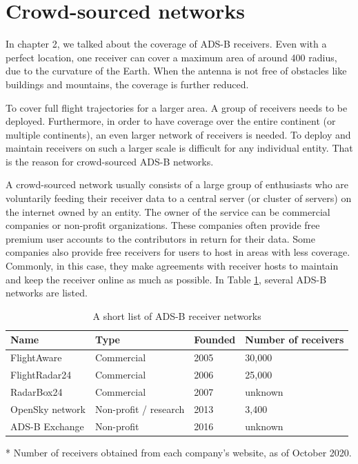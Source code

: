 \section{Crowd-sourced networks}

In chapter 2, we talked about the coverage of ADS-B receivers. Even with a perfect location, one receiver can cover a maximum area of around 400 radius, due to the curvature of the Earth. When the antenna is not free of obstacles like buildings and mountains, the coverage is further reduced. 

To cover full flight trajectories for a larger area. A group of receivers needs to be deployed. Furthermore, in order to have coverage over the entire continent (or multiple continents), an even larger network of receivers is needed. To deploy and maintain receivers on such a larger scale is difficult for any individual entity. That is the reason for crowd-sourced ADS-B networks. 

A crowd-sourced network usually consists of a large group of enthusiasts who are voluntarily feeding their receiver data to a central server (or cluster of servers) on the internet owned by an entity. The owner of the service can be commercial companies or non-profit organizations. These companies often provide free premium user accounts to the contributors in return for their data. Some companies also provide free receivers for users to host in areas with less coverage. Commonly, in this case, they make agreements with receiver hosts to maintain and keep the receiver online as much as possible. In Table \ref{tb:adsb_networks}, several ADS-B networks are listed.

\begin{table}[ht]
\caption{A short list of ADS-B receiver networks}
\label{tb:adsb_networks}
\begin{threeparttable}
\begin{tabular}{|l|l|l|l|}
\hline
\textbf{Name} & \textbf{Type} & \textbf{Founded} & \textbf{Number of receivers} \\ \hline
FlightAware & Commercial & 2005 & 30,000\tnote{*} \\ \hline
FlightRadar24 & Commercial & 2006 & 25,000\tnote{*} \\ \hline
RadarBox24 & Commercial & 2007 & unknown \\ \hline
OpenSky network & Non-profit / research & 2013 & 3,400\tnote{*} \\ \hline
ADS-B Exchange & Non-profit & 2016 & unknown \\ \hline
\end{tabular}
\begin{tablenotes}
\item[*] Number of receivers obtained from each company's website, as of October 2020.
\end{tablenotes}
\end{threeparttable}    
\end{table}

